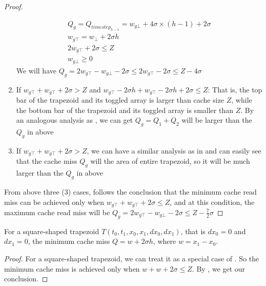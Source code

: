 \begin{proof}
\begin{enumerate}
\begin{equation}
\begin{array}{l}
          Q_g = Q_{timestep_{h-1}}= w_{g\bot} + 4 \sigma \times (h-1) + 2 \sigma \\
          w_{g\top} = w_{\bot} + 2 \sigma h \\
          2 w_{g\top} + 2 \sigma \leq Z \\
          w_{g\bot} \geq 0
          \end{array}
          \end{equation}
          We will have $Q_g = 2 w_{g\top} - w_{g\bot} - 2 \sigma \leq 2 w_{g\top} - 2 \sigma \leq Z - 4 \sigma$
	\item \label{case:topTrapezoid2} If $w_{g\top} + w_{g\top} + 2
          \sigma > Z$ and $w_{g\top} - 2 \sigma h + w_{g\top} - 2 \sigma
          h + 2 \sigma \leq Z$: That is, the top bar of the trapezoid
          and its toggled array is larger than cache size $Z$, while
          the bottom bar of the trapezoid and its toggled array is
          smaller than $Z$. By an analogous analysis as
           , we can
          get $Q_g= Q_1 + Q_2$ will be larger than the
          $Q_g$ in above 
	
	\item \label{case:upTrapezoid3} If $w_{g\top} + w_{g\top} + 2
          \sigma > Z$, we can have a similar analysis as in
            and can
          easily see that the cache miss $Q_g$ will the area of
          entire trapezoid, so it will be much larger than the
          $Q_g$ in above 
\end{enumerate}
From above three (3) cases, follows the conclusion that the minimum cache read miss can be
achieved only when $w_{g\top} + w_{g\top} + 2 \sigma \leq Z$, 
and at this condition, the maximum cache read miss will be
$Q_g = 2 w_{g\top} - w_{g\bot} - 2 \sigma \leq Z - \frac{7}{2} \sigma$
\end{proof}

\begin{corollary}
For a square-shaped trapezoid $T(t_0, t_1, x_0, x_1, dx_0, dx_1)$,
that is $dx_0 = 0$ and $dx_1 = 0$, the minimum cache miss $Q = w + 2
\sigma h$, where $w = x_1 - x_0$.
\label{cor:squareTrapezoid}
\end{corollary}

\begin{proof}
For a square-shaped trapezoid, we can treat it as a special case of
. So the minimum cache miss is achieved only
when $w + w + 2 \sigma \leq Z$. By 
, we get our conclusion.
\end{proof}


